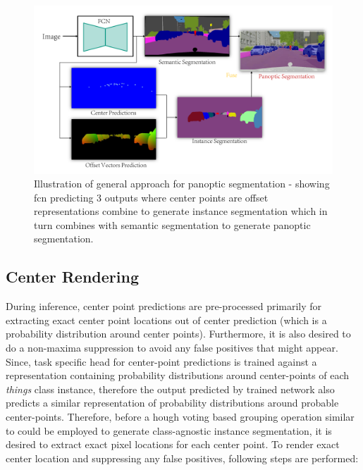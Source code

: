 \begin{figure}[!ht]
    \includegraphics[width = \textwidth]{Graphics/Methodology/panoptic_seg_approach.pdf}
    \caption[Panoptic Segmentation Approach]{Illustration of general approach for panoptic segmentation - showing \gls{fcn} predicting 3 outputs where center points are offset representations combine to generate instance segmentation which in turn combines with semantic segmentation to generate panoptic segmentation.}
    \label{fig:panoptic_seg_approach}
\end{figure}


\subsection{Center Rendering}
\label{subsec:center_rendering}

During inference, center point predictions are pre-processed primarily for extracting exact center point locations out of center prediction (which is a probability distribution around center points). Furthermore, it is also desired to do a non-maxima suppression to avoid any false positives that might appear. Since, task specific head for center-point predictions is trained against a representation containing probability distributions around center-points of each \textit{things} class instance, therefore the output predicted by trained network also predicts a similar representation of probability distributions around probable center-points. Therefore, before a hough voting based grouping operation similar to \cite{Ballard1981} could be employed to generate class-agnostic instance segmentation, it is desired to extract exact pixel locations for each center point. 
To render exact center location and suppressing any false positives, following steps are performed:

